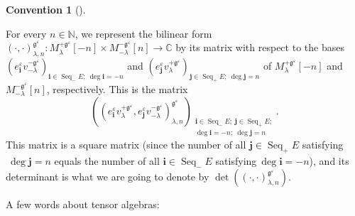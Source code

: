 \documentclass
[numbers=enddot,12pt,final,onecolumn,german,notitlepage]{scrartcl}%
\theoremstyle{definition}
\newtheorem{conv}[theo]{Convention}
\newenvironment{Convention}[1][]
{\begin{conv}[#1]\begin{leftbar}}
{\end{leftbar}\end{conv}}
\begin{document}
\begin{Convention}
For every $n\in\mathbb{N}$, we represent the bilinear form $\left(
\cdot,\cdot\right)  _{\lambda,n}^{\mathfrak{g}^{\varepsilon}}:M_{\lambda
}^{+\mathfrak{g}^{\varepsilon}}\left[  -n\right]  \times M_{-\lambda
}^{-\mathfrak{g}^{\varepsilon}}\left[  n\right]  \rightarrow\mathbb{C}$ by its
matrix with respect to the bases $\left(  e_{\mathbf{i}}^{\varepsilon
}v_{-\lambda}^{-\mathfrak{g}^{\varepsilon}}\right)  _{\mathbf{i}%
\in\operatorname*{Seq}\nolimits_{-}E;\ \deg\mathbf{i}=-n}$ and $\left(
e_{\mathbf{j}}^{\varepsilon}v_{\lambda}^{+\mathfrak{g}^{\varepsilon}}\right)
_{\mathbf{j}\in\operatorname*{Seq}\nolimits_{+}E;\ \deg\mathbf{j}=n}$ of
$M_{\lambda}^{+\mathfrak{g}^{\varepsilon}}\left[  -n\right]  $ and
$M_{-\lambda}^{-\mathfrak{g}^{\varepsilon}}\left[  n\right]  $, respectively.
This is the matrix%
\[
\left(  \left(  e_{\mathbf{i}}^{\varepsilon}v_{\lambda}^{+\mathfrak{g}%
^{\varepsilon}},e_{\mathbf{j}}^{\varepsilon}v_{-\lambda}^{-\mathfrak{g}%
^{\varepsilon}}\right)  _{\lambda,n}^{\mathfrak{g}^{\varepsilon}}\right)
_{\substack{\mathbf{i}\in\operatorname*{Seq}\nolimits_{-}E;\ \mathbf{j}%
\in\operatorname*{Seq}\nolimits_{+}E;\\\deg\mathbf{i}=-n;\ \deg\mathbf{j}%
=n}}.
\]
This matrix is a square matrix (since the number of all $\mathbf{j}%
\in\operatorname*{Seq}\nolimits_{+}E$ satisfying$\ \deg\mathbf{j}=n$ equals
the number of all $\mathbf{i}\in\operatorname*{Seq}\nolimits_{-}E$
satisfying$\ \deg\mathbf{i}=-n$), and its determinant is what we are going to
denote by $\det\left(  \left(  \cdot,\cdot\right)  _{\lambda,n}^{\mathfrak{g}%
^{\varepsilon}}\right)  $.
\end{Convention}

A few words about tensor algebras:
\end{document}
